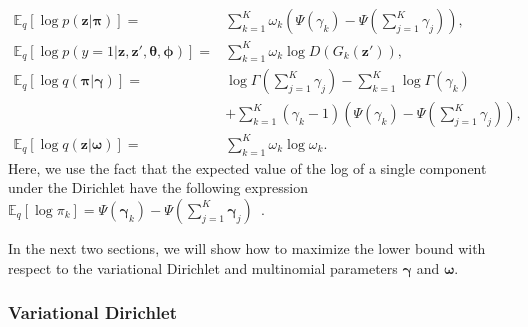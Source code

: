 \documentclass{article}
\begin{document}
\begin{align}
\mathbb{E}_q\left[ \log p\left( \mathbf{z} | \bm{\pi} \right) \right]
=&
\sum_{k=1}^K
\omega_k
\left( \Psi\left( \gamma_k \right) - \Psi\left( \sum\nolimits_{j=1}^K \gamma_j \right)\right),\label{eq:AVarDis7}\\
\mathbb{E}_q\left[ \log p\left( y=1 | \mathbf{z},\mathbf{z}',\bm{\theta},\bm{\phi}\right) \right]
=&
\sum_{k=1}^K
\omega_k
\log D\left( G_k\left( \mathbf{z}'\right) \right),\label{eq:AVarDis8}\\
\mathbb{E}_q \left[ \log  q\left( \bm{\pi} | \bm{\gamma} \right) \right]
=&
\log\Gamma\left( \sum\nolimits_{j=1}^K \gamma_j \right)
- \sum_{k=1}^K \log\Gamma\left(\gamma_k\right)\nonumber\\
&+\sum_{k=1}^K
\left( \gamma_k-1 \right)
\left( \Psi\left(\gamma_k\right)-\Psi\left(\sum\nolimits_{j=1}^K\gamma_j\right) \right),\label{eq:AVarDis9}\\
\mathbb{E}_q\left[ \log  q\left( \mathbf{z} | \bm{\omega} \right) \right]
=&
\sum_{k=1}^K
\omega_k
\log \omega_k.
\label{eq:AVarDis10}
\end{align}
Here, we use the fact that the expected value of the log of a single component under the Dirichlet have the following expression $\mathbb{E}_q\left[\log \pi_k\right] = \Psi\left(\bm{\gamma}_k\right)-\Psi\left(\sum_{j=1}^K \bm{\gamma}_j\right)$~\cite{blei2003latent}.


In the next two sections, we will show how to maximize the lower bound with respect to the variational Dirichlet and multinomial parameters $\bm{\gamma}$ and $\bm{\omega}$.


\subsubsection{Variational Dirichlet}
\label{App:VaDirichlet}
\end{document}
